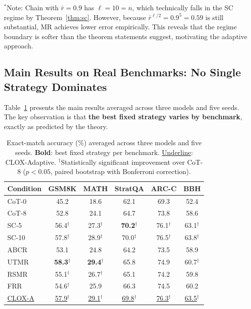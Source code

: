 \documentclass{article}
\begin{document}
$^*$Note: Chain with $\bar{r}=0.9$ has $\ell = 10 = n$, which technically falls in the SC regime by Theorem~\ref{thm:sc}. However, because $\bar{r}^{\ell/2} = 0.9^5 = 0.59$ is still substantial, MR achieves lower error empirically. This reveals that the regime boundary is softer than the theorem statements suggest, motivating the adaptive approach.

\subsection{Main Results on Real Benchmarks: No Single Strategy Dominates}

Table~\ref{tab:main} presents the main results averaged across three models and five seeds. The key observation is that \textbf{the best fixed strategy varies by benchmark}, exactly as predicted by the theory.

\begin{table}[t]
\centering
\caption{Exact-match accuracy (\%) averaged across three models and five seeds. \textbf{Bold}: best fixed strategy per benchmark. \underline{Underline}: CLOX-Adaptive. $^\dagger$Statistically significant improvement over CoT-8 ($p < 0.05$, paired bootstrap with Bonferroni correction).}
\label{tab:main}
\small
\begin{tabular}{lccccc}
\toprule
\textbf{Condition} & \textbf{GSM8K} & \textbf{MATH} & \textbf{StratQA} & \textbf{ARC-C} & \textbf{BBH} \\
\midrule
CoT-0 & 45.2 & 18.6 & 62.1 & 69.3 & 52.4 \\
CoT-8 & 52.8 & 24.1 & 64.7 & 73.8 & 58.6 \\
SC-5 & 56.4$^\dagger$ & 27.3$^\dagger$ & \textbf{70.2}$^\dagger$ & 76.1$^\dagger$ & 63.1$^\dagger$ \\
SC-10 & 57.8$^\dagger$ & 28.9$^\dagger$ & 70.0$^\dagger$ & 76.5$^\dagger$ & 63.8$^\dagger$ \\
ABCR & 53.1 & 24.8 & 64.2 & 73.5 & 58.9 \\
UTMR & \textbf{58.3}$^\dagger$ & \textbf{29.4}$^\dagger$ & 65.8 & 74.9 & 60.7$^\dagger$ \\
RSMR & 55.1$^\dagger$ & 26.7$^\dagger$ & 65.1 & 74.2 & 59.8 \\
FRR & 54.6$^\dagger$ & 25.9 & 66.3 & 74.5 & 60.2 \\
\midrule
\underline{CLOX-A} & \underline{57.9}$^\dagger$ & \underline{29.1}$^\dagger$ & \underline{69.8}$^\dagger$ & \underline{76.3}$^\dagger$ & \underline{63.5}$^\dagger$ \\
\bottomrule
\end{tabular}
\end{table}
\end{document}
